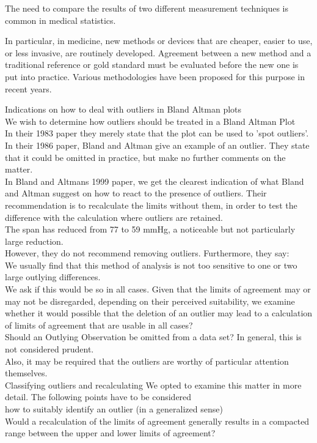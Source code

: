 \documentclass[Main.tex]{subfiles}
\begin{document}
The need to compare the results of two different measurement
techniques is common in medical statistics.

In particular, in medicine, new methods or devices that are
cheaper, easier to use, or less invasive, are routinely developed.
Agreement between a new method and a traditional reference or gold
standard must be evaluated before the new one is put into
practice. Various methodologies have been proposed for this
purpose in recent years.

Indications on how to deal with outliers in Bland Altman plots
\\
We wish to determine how outliers should be treated in a Bland
Altman Plot
\\
In their 1983 paper they merely state that the plot can be used to
'spot outliers'.
\\
In  their 1986 paper, Bland and Altman give an example of an
outlier. They state that it could be omitted in practice, but make
no further comments on the matter.
\\
In Bland and Altmans 1999 paper, we get the clearest indication of
what Bland and Altman suggest on how to react to the presence of
outliers. Their recommendation is to recalculate the limits
without them, in order to test the difference with the calculation
where outliers are retained.\\

The span has reduced from 77 to 59 mmHg, a noticeable but not
particularly large reduction.
\\
However, they do not recommend removing outliers. Furthermore,
they say:
\\
We usually find that this method of analysis is not too sensitive
to one or two large outlying differences.
\\
We ask if this would be so in all cases. Given that the limits of
agreement may or may not be disregarded, depending on their
perceived suitability, we examine whether it would possible that
the deletion of an outlier may lead to a calculation of limits of
agreement that are usable in all cases?
\\
Should an Outlying Observation be omitted from a data set? In
general, this is not considered prudent.
\\
Also, it may be required that the outliers are worthy of
particular attention themselves.
\\
Classifying outliers and recalculating We opted to examine this
matter in more detail. The following points have to be considered
\\how to suitably identify an outlier (in a generalized sense)
\\Would a recalculation of the limits of agreement generally
results in  a compacted range between the upper and lower limits
of agreement?
\end{document}
